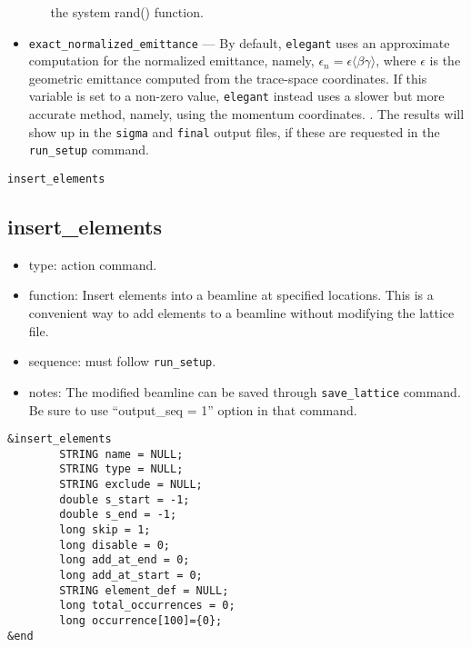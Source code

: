 \documentclass[11pt]{article}
\begin{document}
\begin{itemize}
\begin{itemize}
      the system rand() function.
    \end{itemize}
\item \verb|exact_normalized_emittance| --- By default, \verb|elegant| uses an approximate computation for the normalized emittance, namely,
$\epsilon_n = \epsilon\langle\beta\gamma\rangle$, where $\epsilon$ is the geometric emittance computed from the trace-space coordinates.
If this variable is set to a non-zero value, \verb|elegant| instead uses a slower but more accurate method, namely, using the momentum coordinates.
\cite{Floettmann-PRSTAB6-034202}. The results will show up in the \verb|sigma| and \verb|final| output files, if these are requested in the \verb|run_setup| command.
  \end{itemize}

\newpage
\begin{center}{\Large\verb|insert_elements|}\end{center}
\subsection{insert\_elements \label{subsec:insertelements}}

\begin{itemize}
\item type: action command.
\item function: Insert elements into a beamline at specified locations. This is a convenient way to
 add elements to a beamline without modifying the lattice file.
\item sequence: must follow \verb|run_setup|.
\item notes: 
	The modified beamline can be saved through \verb|save_lattice|
   command. Be sure to use ``output\_seq = 1'' option in that command.  
\end{itemize}

\begin{verbatim}
&insert_elements
        STRING name = NULL;
        STRING type = NULL;
        STRING exclude = NULL;
        double s_start = -1;
        double s_end = -1;
        long skip = 1;
        long disable = 0;
        long add_at_end = 0;
        long add_at_start = 0;
        STRING element_def = NULL;
        long total_occurrences = 0;
        long occurrence[100]={0};
&end
\end{verbatim}
\end{document}
